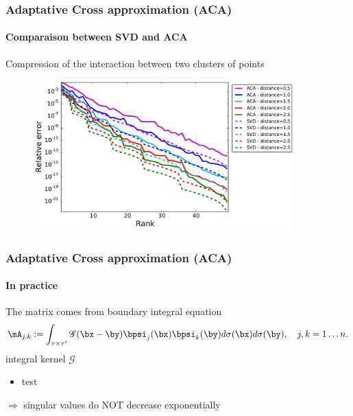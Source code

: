 \begin{frame}
\frametitle{Adaptative Cross approximation (ACA)}
\framesubtitle{Comparaison between SVD and ACA} 
Compression of the interaction between two clusters of points
\begin{figure}
	\centering 
	\includegraphics[width=0.9\textwidth]{../images/graphe_output_err_decrease}
\end{figure}


\end{frame}


\begin{frame}
\frametitle{Adaptative Cross approximation (ACA)}
\framesubtitle{In practice} 
The matrix comes from boundary integral equation 
\begin{equation*}\label{GalerkinMatrix}
\mA_{j,k}:= \int_{\tau\times\tau'}\mathscr{G}(\bx-\by) \bpsi_{j}(\bx)\bpsi_{k}(\by) d\sigma(\bx) d\sigma(\by),\quad j,k = 1\dots n.
\end{equation*}
integral kernel $\mathscr{G}$ 
\begin{itemize}
\item test
\end{itemize}


  $\Rightarrow$ singular values do NOT decrease exponentially 
 
\end{frame}







